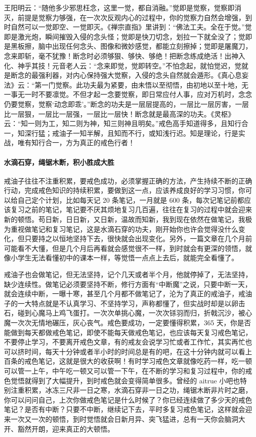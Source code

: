 王阳明云：“随他多少邪思枉念，这里一觉，都自消融。”觉即是觉察，觉察即消灭，前提是觉察力够强，在一次次反观内心的过程中，你的觉察力自然会增强，到时自然可以一觉即空、一觉即灭。《禅宗直指》里讲到：“佛法工夫。全在于觉。”觉即是激光炮，瞬间摧毁入侵的念头怪；觉即是快刀切念，划拉一下就全没了；觉即是黑板擦，脑中出现任何念头、图像和微妙感觉，都能立刻擦掉；觉即是屠魔刀，念来即斩，毫不犹豫！断念时必须够狠、够快、够绝！把断念练成绝活！出神入化、神乎其技！元音老人云：“念来即觉，觉即转空。”不怕念起，就怕觉迟，觉就是断念的最强利器，对内心保持强大觉察，入侵的念头自然就会遁形。《真心息妄法》云：“第一门觉察。此功夫最为紧要，由未悟以至彻悟，由初地以至十地，无一事无一时不要凛觉。不但才起一念要觉察，即日常应付人事，应对万机时，念念仍要觉察，觉察‘动念即乖’。”断念的功夫是一层层提高的，一层比一层厉害，一层比一层狠，一层比一层强，一层比一层快！断念就是最高深的功夫。《灵枢》云：“知一则为工，知二则为神，知三则神且明矣。”戒色高手知道得多，且知行合一，知深行猛；戒油子一知半解，且知而不行，或知浅行迟。知是理论，行是实战，唯有知行合一，方为真正的戒色行者！

\paragraph{水滴石穿，绳锯木断，积小胜成大胜}

戒油子往往不注重积累，要戒色成功，必须掌握正确的方法，产生持续不断的正确行动，完成戒色知识的持续积累，要做到这一点，应该养成良好的学习习惯，你可以给自己定个计划，比如每天记 20 条笔记，一月就是 600 条，每次记笔记前都应该复习之前的笔记，笔记要不厌其烦地复习几百遍，往往在复习的过程中就会迎来新的顿悟。苟日新，日日新，又日新，温故而知新，我到现在依然在做笔记，我极为重视做笔记和复习笔记，这是水滴石穿的功夫，刚开始你也许会觉得没什么变化，但只要持之以恒地坚持下去，很快就会出现变化。另外，一篇文章在几个月前可能看不大懂，但是几个月后再看就会感觉很不一样，到时就会有更深的领悟，就像小学生无法看懂初中的课本一样，等觉悟一点点上去后，就能完全看懂了。

戒油子也会做笔记，但无法坚持，记个几天或者半个月，他就停掉了，无法坚持，缺少连续性。做笔记必须要坚持不断，修行方面有“中断魔”之说，只要中断一天，就会连续中断，一曝十寒，甚至几个月都不做笔记了，沦为了真正的戒油子，戒油子的一大特点就是不认真学习、不坚持学习，声称都懂了，但实战时却是以卵击石，碰到心魔马上鸡飞蛋打。一次次单挑心魔，一次次铩羽而归，折戟沉沙，被心魔一次次无情地碾压，灰心丧气。戒色要成功，一定要懂得积累，365 天，你是否能做到每天都做戒色笔记，即使不能每天做戒色笔记，也应该每天复习戒色笔记，不要停止学习，不要离开戒色文章，有的戒友会说学习忙或者工作忙，其实再忙也可以挤时间，每天十分钟或者半小时的时间总是有的吧，在这十分钟内就可以看上百条的戒色笔记，这就是很大的收获啊！有时学习戒色文章就像吃药一样，吃一顿可以管一上午，中午吃一顿又可以管一下午，在不断的学习和复习过程中，你的戒色觉悟就得到了大幅提升，到时戒色就会变得简单很多。曾经的 aitrue 小吧也特别注重积累，冰冻三尺非一日之寒，水滴石穿非一日之功，绳锯木断非片时之磨，你可以问问自己，上次你做戒色笔记是什么时候了？你已经连续做了多少天的戒色笔记？是否有中断？只要不中断，继续记下去，平时多复习戒色笔记，这样就会迎来一次又一次的顿悟，到时觉悟就会日新月异、突飞猛进，总有一天你会脑洞大开、豁然开朗，迎来真正的大顿悟。

